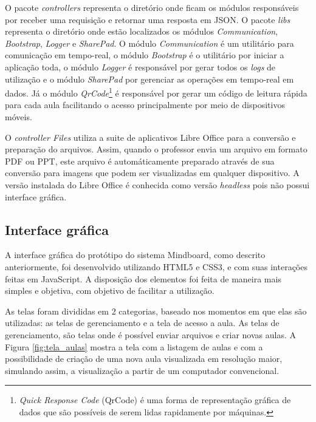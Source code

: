 O pacote \emph{controllers} representa o diretório onde ficam os módulos responsáveis por receber uma requisição e retornar uma resposta em JSON. O pacote \emph{libs} representa o diretório onde estão localizados os módulos \emph{Communication}, \emph{Bootstrap}, \emph{Logger} e \emph{SharePad}. O módulo \emph{Communication} é um utilitário para comunicação em tempo-real, o módulo \emph{Bootstrap} é o utilitário por iniciar a aplicação toda, o módulo \emph{Logger} é responsável por gerar todos os \emph{logs} de utilização e o módulo \emph{SharePad} por gerenciar as operações em tempo-real em dados. Já o módulo \emph{QrCode}\footnote{\emph{Quick Response Code} (QrCode) é uma forma de representação gráfica de dados que são possíveis de serem lidas rapidamente por máquinas.}  é responsável por gerar um código de leitura rápida para cada aula facilitando o acesso principalmente por meio de dispositivos móveis.



O \emph{controller Files} utiliza a suite de aplicativos Libre Office para a conversão e preparação do arquivos. Assim, quando o professor envia um arquivo em formato PDF ou PPT, este arquivo é automáticamente preparado através de sua conversão para imagens que podem ser visualizadas em qualquer dispositivo. A versão instalada do Libre Office é conhecida como versão \emph{headless} pois não possui interface gráfica.

\subsection{Interface gráfica}
\label{sec:interface_grafica}

A interface gráfica do protótipo do sistema Mindboard, como descrito anteriormente, foi desenvolvido utilizando HTML5 e CSS3, e com suas interações feitas em JavaScript. A disposição dos elementos foi feita de maneira mais simples e objetiva, com objetivo de facilitar a utilização.

As telas foram divididas em 2 categorias, baseado nos momentos em que elas são utilizadas: as telas de gerenciamento e a tela de acesso a aula. As telas de gerenciamento, são telas onde é possível enviar arquivos e criar novas aulas. A Figura \ref{fig:tela_aulas} mostra a tela com a listagem de aulas e com a possibilidade de criação de uma nova aula visualizada em resolução maior, simulando assim, a visualização a partir de um computador convencional.

